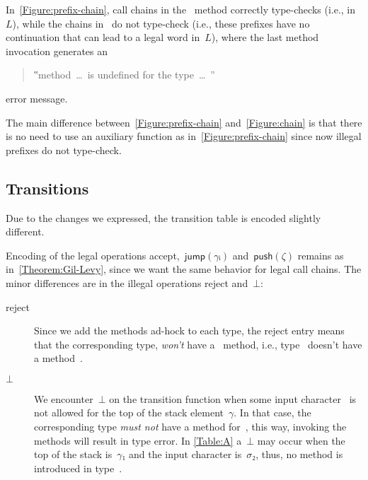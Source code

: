 \documentclass[a4paper,USenglish]{lipics-v2016}
\begin{document}
In~\cref{Figure:prefix-chain}, call chains in the~ method
  correctly type-checks (i.e., in~$L$), while the chains in~
  do not type-check (i.e., these prefixes have no continuation that can lead to a legal word in~$L$),
  where the last method invocation generates an
\begin{quote}
  ‟\textsf{method~…~is undefined for the type~…~}”
\end{quote}
  error message.

The main difference between~\cref{Figure:prefix-chain} and~\cref{Figure:chain} is that there is no need to
  use an auxiliary function  as in~\cref{Figure:prefix-chain} since now illegal
  prefixes do not type-check.

\subsection{Transitions}
Due to the changes we expressed, the transition table is encoded slightly different.

Encoding of the legal operations \textsf{accept},~$\textsf{jump}(γᵢ)$ and~$\textsf{push}(ζ)$
  remains as in~\cref{Theorem:Gil-Levy}, since we want the same behavior for legal call chains.
The minor differences are in the illegal operations \textsf{reject} and~$⊥$:

\begin{description}
 \item[\textsf{reject}] Since we add the methods ad-hock to each type, the reject entry means
   that the corresponding type, \emph{won't} have a~\cc{\$()} method, i.e., type~
   doesn't have a method~\cc{\$()}.
 \item[$⊥$] We encounter~$⊥$ on the transition function when some input character~
   is not allowed for the top of the stack element~$γ$. In that case, the corresponding type 
   \emph{must not} have a method for~, this way, invoking the methods will result in type error.
   In \cref{Table:A} a~$⊥$ may occur when the top of the stack is~$γ₁$ and the input character is~$σ₂$,
   thus, no method  is introduced in type~.
\end{description}
\end{document}
